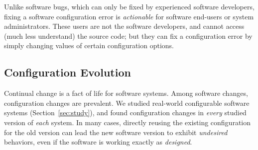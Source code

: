 Unlike software bugs,
which can only be fixed by experienced software developers, fixing a software
configuration error is \textit{actionable} for software end-users
or system administrators. These users are not the software developers,
and cannot access (much less understand)
the source code;  but they can fix a configuration error by simply changing
values of certain configuration options.


\vspace{-1mm}
\subsection{Configuration Evolution}
\label{sec:evolerror}

Continual change is a fact of life for software systems.
Among software changes, configuration changes are prevalent.
We studied \studysubjnum real-world configurable software
systems (Section~\ref{sec:study}), and
found configuration changes in \textit{every} studied
version of \textit{each} system. In many 
cases, directly reusing the existing configuration
for the old version can lead the new software version
to exhibit \textit{undesired} behaviors,
even if the software is working exactly as \textit{designed}.






